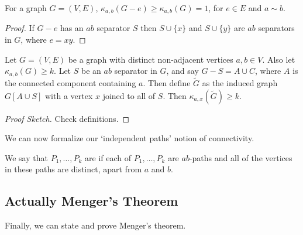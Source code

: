 \documentclass[a4paper]{scrartcl}
\begin{document}
\begin{lemma}
	For a graph $G = (V, E)$, 
	$\kappa_{a, b}(G - e) \geq \kappa_{a, b}(G) = 1$, for $e \in E$ and $a \sim b$.
\end{lemma}
\begin{proof}
	If $G - e$ has an $ab$ separator $S$ then $S \cup \{x\}$ and $S \cup \{y\}$ are $ab$ separators in $G$, where $e = xy$.
\end{proof}



\begin{lemma}
	Let $G = (V, E)$ be a graph with distinct non-adjacent vertices $a, b \in V$. Also let $\kappa_{a, b}(G) \geq k$. Let $S$ be an $ab$ separator in $G$, and say $G - S = A \cup C$, where $A$ is the connected component containing $a$. Then define $\tilde{G}$ as the induced graph $G[A \cup S]$ with a vertex $x$ joined to all of $S$. Then $\kappa_{a, x}(\tilde{G}) \geq k$.
\end{lemma}
\begin{proof}[Proof Sketch]
	Check definitions.
\end{proof}

We can now formalize our `independent paths' notion of connectivity.

\begin{definition}
	We say that $P_1, \dots, P_k$ are  if each of $P_1, \dots, P_k$ are $ab$-paths and all of the vertices in these paths are distinct, apart from $a$ and $b$.
\end{definition}

\subsection{Actually Menger's Theorem}

Finally, we can state and prove Menger's theorem.
\end{document}
